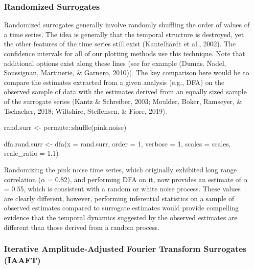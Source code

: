 \documentclass[
  man]{apa6}
\newenvironment{Shaded}{\begin{snugshade}}{\end{snugshade}}
\newcommand{\AttributeTok}[1]{\textcolor[rgb]{0.77,0.63,0.00}{#1}}
\newcommand{\DecValTok}[1]{\textcolor[rgb]{0.00,0.00,0.81}{#1}}
\newcommand{\FloatTok}[1]{\textcolor[rgb]{0.00,0.00,0.81}{#1}}
\newcommand{\FunctionTok}[1]{\textcolor[rgb]{0.00,0.00,0.00}{#1}}
\newcommand{\NormalTok}[1]{#1}
\newcommand{\OtherTok}[1]{\textcolor[rgb]{0.56,0.35,0.01}{#1}}
\newcommand{\SpecialCharTok}[1]{\textcolor[rgb]{0.00,0.00,0.00}{#1}}
\begin{document}
\hypertarget{randomized-surrogates}{%
\subsubsection{Randomized Surrogates}\label{randomized-surrogates}}

Randomized surrogates generally involve randomly shuffling the order of
values of a time series. The idea is generally that the temporal
structure is destroyed, yet the other features of the time series still
exist (Kantelhardt et al., 2002). The confidence
intervals for all of our plotting methods use this technique. Note that
additional options exist along these lines (see for example
(Dumas, Nadel, Soussignan, Martinerie, \& Garnero, 2010)). The key comparison here
would be to compare the estimates extracted from a given analysis (e.g.,
DFA) on the observed sample of data with the estimates derived from an
equally sized sample of the surrogate series (Kantz \& Schreiber, 2003; Moulder, Boker, Ramseyer, \& Tschacher, 2018; Wiltshire, Steffensen, \& Fiore, 2019).

\begin{Shaded}
\begin{Highlighting}[]
\NormalTok{rand.surr }\OtherTok{\textless{}{-}}\NormalTok{ permute}\SpecialCharTok{::}\FunctionTok{shuffle}\NormalTok{(pink.noise)}

\NormalTok{dfa.rand.surr }\OtherTok{\textless{}{-}} \FunctionTok{dfa}\NormalTok{(}\AttributeTok{x =}\NormalTok{ rand.surr, }\AttributeTok{order =} \DecValTok{1}\NormalTok{, }\AttributeTok{verbose =} \DecValTok{1}\NormalTok{,}
\AttributeTok{scales =}\NormalTok{ scales, }\AttributeTok{scale\_ratio =} \FloatTok{1.1}\NormalTok{)}
\end{Highlighting}
\end{Shaded}

Randomizing the pink noise time series, which originally exhibited long
range correlation (\(\alpha\) = 0.82), and performing DFA on
it, now provides an estimate of \(\alpha\) = 0.55,
which is consistent with a random or white noise process. These values
are clearly different, however, performing inferential statistics on a
sample of observed estimates compared to surrogate estimates would
provide compelling evidence that the temporal dynamics suggested by the
observed estimates are different than those derived from a random
process.

\hypertarget{iterative-amplitude-adjusted-fourier-transform-surrogates-iaaft}{%
\subsubsection{Iterative Amplitude-Adjusted Fourier Transform Surrogates (IAAFT)}\label{iterative-amplitude-adjusted-fourier-transform-surrogates-iaaft}}
\end{document}
